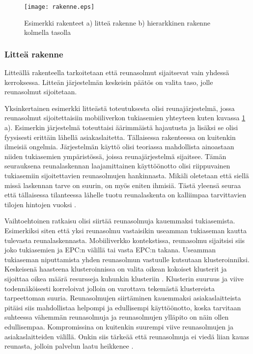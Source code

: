 \begin{figure}[tb]
\texttt{[image: rakenne.eps]}
\caption{Esimerkki rakenteet a) litteä rakenne b) hierarkkinen rakenne kolmella tasolla} \label{fig:rakenne}
\end{figure}

\subsubsection{Litteä rakenne}
Litteällä rakenteella tarkoitetaan että reunasolmut sijaitsevat vain yhdessä kerroksessa. Litteän järjestelmän keskeisin päätös on valita taso, jolle reunasolmut sijoitetaan.

Yksinkertainen esimerkki litteästä toteutuksesta olisi reunajärjestelmä, jossa reunasolmut sijoitettaisiin mobiiliverkon tukiasemien yhteyteen kuten kuvassa \ref{fig:rakenne} a). Esimerkin järjestelmä  toteuttaisi äärimmäistä hajautusta ja lisäksi se olisi fyysisesti erittäin lähellä asiakaslaitetta. Tällaisessa rakenteessa on kuitenkin ilmeisiä ongelmia. Järjestelmän käyttö olisi teoriassa mahdollista ainoastaan niiden tukiasemien ympäristössä, joissa reunajärjestelmä sijaitsee. Tämän seurauksena reunalaskennan laajamittainen käyttöönotto olisi riippuvainen tukiasemiin sijoitettavien reunasolmujen hankinnasta. Mikäli oletetaan että siellä missä laskennan tarve on suurin, on myös eniten ihmisiä. Tästä yleensä seuraa että tällaisessa tilanteessa lähelle tuotu reunalaskenta on kalliimpaa tarvittavien tilojen hintojen vuoksi \cite{mao17}.

Vaihtoehtoinen ratkaisu olisi siirtää reunasolmuja kauemmaksi tukiasemista. Esimerkiksi siten että yksi reunasolmu vastaisikin useamman tukiaseman kautta tulevasta reunalaskennasta. Mobiiliverkko kontekstissa, reunasolmu sijaitsisi siis joko tukiasemien ja EPC:n välillä tai vasta EPC:n takana.  
Useamman tukiaseman niputtamista yhden reunasolmun vastuulle kutsutaan klusteroinniksi. 
Keskeisenä haasteena klusteroinnissa on valita oikean kokoiset klusterit ja sijoittaa oikea määrä resursseja kuhunkin klusteriin \cite{malandrino2016close}.
Klusterin suuruus ja viive todennäköisesti korreloivat jolloin on varottava tekemästä klustereista tarpeettoman suuria.
Reunasolmujen siirtäminen kauemmaksi asiakaslaitteista pitäisi siis mahdollistaa helpompi ja edullisempi käyttöönotto, koska tarvitaan suhteessa vähemmän reunasolmuja ja reunasolmujen ylläpito on näin ollen edullisempaa.
Kompromissina on kuitenkin suurempi viive reunasolmujen ja asiakaslaitteiden välillä. 
Onkin siis tärkeää että reunasolmuja ei viedä liian kauas reunasta, jolloin palvelun laatu heikkenee \cite{mao17}. 


